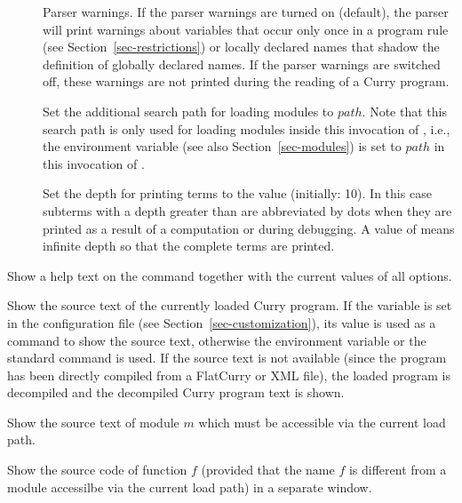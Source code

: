 \begin{description}
\begin{description}
\item[] Parser warnings. If the parser
warnings are turned on (default), the parser will print
warnings about variables that occur only once in a program rule
(see Section~\ref{sec-restrictions})
or locally declared names that shadow the definition of
globally declared names. If the parser warnings are switched off,
these warnings are not printed during the reading of a Curry program.

\item[] Set the additional search path
for loading modules to $path$.
Note that this search path is only used for loading modules
inside this invocation of \CYS, i.e., the environment variable
 (see also Section~\ref{sec-modules})
is set to $path$ in this invocation of \CYS.

\item[]
Set the depth for printing terms to the value  (initially: 10).
In this case subterms with a depth greater than  are abbreviated
by dots when they are printed as a result of a computation
or during debugging. A value of  means infinite depth
so that the complete terms are printed.

\end{description}

\item[\fbox{\code{:set}}]
Show a help text on the 
command together with the current values of all options.

\item[\fbox{\code{:show}}]
Show the source text of the currently loaded Curry program.
If the variable  is set in the
configuration file 
(see Section~\ref{sec-customization}),
its value is used as a command to show the source text,
otherwise the environment variable  or the standard command
 is used.
If the source text is not available
(since the program has been directly compiled from a FlatCurry
or XML file), the loaded program is decompiled and
the decompiled Curry program text is shown.

\item[\fbox{\code{:show $m$}}]
Show the source text of module $m$ which must be accessible
via the current load path.

\item[\fbox{\code{:show $f$}}]
Show the source code of function $f$ (provided that the name $f$
is different from a module accessilbe via the current load path)
in a separate window.


\end{description}
